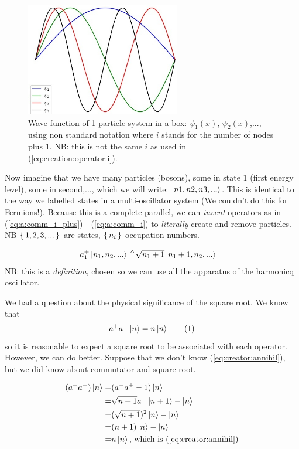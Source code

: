 \documentclass[]{article}
\newcommand\numberthis{\addtocounter{equation}{1}\tag{\theequation}}
\begin{document}
\begin{figure}[H]
	\begin{center}
		\caption[Wave function of 1-particle system in a box]{Wave function of 1-particle system in a box: $\psi_1(x)$, $\psi_2(x)$,..., using non standard notation where $i$ stands for the number of nodes plus 1. NB: this is not the same $i$ as used in (\ref{eq:creation:operator:i}).}\label{fig:aqm-6-sine}
		\includegraphics[width=0.6\textwidth]{aqm-6-sine}
	\end{center}
\end{figure}

Now imagine that we have many particles (bosons), some in state 1 (first energy level), some in second,..., which we will write: $\ket{n1,n2,n3,...}$. This is identical to the way we labelled states in a multi-oscillator system (We couldn't do this for Fermions!).  Because this is a complete parallel, we can \emph{invent} operators as in (\ref{eq:a:comm_i_plus}) - (\ref{eq:a:comm_i}) to \emph{literally} create and remove particles. NB $\set{1,2,3,...}$ are states, $\set{n_i}$ occupation numbers.

\begin{align*}
	a_1^+\ket{n_1,n_2,...} \triangleq& \sqrt{n_1+1} \ket{n_1+1,n_2,...}
\end{align*}
NB: this is a \emph{definition}, chosen so we can use all the apparatus of the harmonicq oscillator.

We had a question about the physical significance of the square root. We know that
\begin{align*}
	a^+a^-\ket{n} = n \ket{n} \numberthis \label{eq:creator:annihil}
\end{align*}
so it is reasonable to expect a square root to be associated with each operator. However, we can do better. Suppose that we don't know (\ref{eq:creator:annihil}), but we did know about commutator and square root.

\begin{align*}
	(a^+a^-)\ket{n}=&(a^-a^+-1)\ket{n}\\
	=&\sqrt{n+1}a^-\ket{n+1}-\ket{n}\\
	=&(\sqrt{n+1})^2\ket{n}-\ket{n}\\
	=&(n+1)\ket{n}-\ket{n}\\
	=&n\ket{n} \text{, which is  (\ref{eq:creator:annihil})}
\end{align*}
\end{document}
